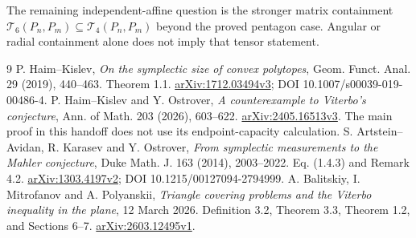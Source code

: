 \documentclass[11pt,a4paper]{article}
\theoremstyle{definition}\newtheorem{definition}[theorem]{Definition}
\theoremstyle{remark}\newtheorem{remark}[theorem]{Remark}
\newcommand{\Tfour}{\mathcal T_4}
\newcommand{\Tsix}{\mathcal T_6}
\begin{document}
The remaining independent-affine question is the stronger matrix containment
$\Tsix(P_n,P_m)\subseteq\Tfour(P_n,P_m)$ beyond the proved pentagon case.
Angular or radial containment alone does not imply that tensor statement.

\begin{thebibliography}{9}
 P. Haim--Kislev, \emph{On the symplectic size of convex polytopes}, Geom. Funct. Anal. 29 (2019), 440--463. Theorem 1.1. \href{https://arxiv.org/html/1712.03494v3}{arXiv:1712.03494v3}; DOI 10.1007/s00039-019-00486-4.
 P. Haim--Kislev and Y. Ostrover, \emph{A counterexample to Viterbo's conjecture}, Ann. of Math. 203 (2026), 603--622. \href{https://arxiv.org/html/2405.16513v3}{arXiv:2405.16513v3}. The main proof in this handoff does not use its endpoint-capacity calculation.
 S. Artstein--Avidan, R. Karasev and Y. Ostrover, \emph{From symplectic measurements to the Mahler conjecture}, Duke Math. J. 163 (2014), 2003--2022. Eq. (1.4.3) and Remark 4.2. \href{https://arxiv.org/html/1303.4197v2}{arXiv:1303.4197v2}; DOI 10.1215/00127094-2794999.
 A. Balitskiy, I. Mitrofanov and A. Polyanskii, \emph{Triangle covering problems and the Viterbo inequality in the plane}, 12 March 2026. Definition 3.2, Theorem 3.3, Theorem 1.2, and Sections 6--7. \href{https://arxiv.org/html/2603.12495v1}{arXiv:2603.12495v1}.
\end{thebibliography}
\end{document}
